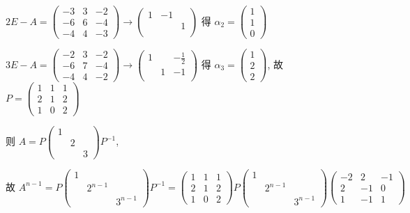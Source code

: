 		 \( 2E-A = \begin{pmatrix}
			 -3 & 3 & -2 \\
			 -6 & 6 & -4 \\
			 -4 & 4 & -3
		 \end{pmatrix} \rightarrow \begin{pmatrix}
			 1 & -1 &   \\
			   &    & 1 \\
			   &    &
		 \end{pmatrix} \) 得 \( \alpha_{2} = \begin{pmatrix}
			 1 \\
			 1 \\
			 0
		 \end{pmatrix} \)

		 \( 3E-A = \begin{pmatrix}
			 -2 & 3 & -2 \\
			 -6 & 7 & -4 \\
			 -4 & 4 & -2
		 \end{pmatrix} \rightarrow \begin{pmatrix}
			 1 &   & -\frac{1}{2} \\
			   & 1 & -1           \\
			   &   &
		 \end{pmatrix} \) 得 \( \alpha_{3} = \begin{pmatrix}
			 1 \\
			 2 \\
			 2
		 \end{pmatrix} \), 故 \( P = \begin{pmatrix}
			 1 & 1 & 1 \\
			 2 & 1 & 2 \\
			 1 & 0 & 2
		 \end{pmatrix} \)

		 则 \( A = P\begin{pmatrix}
			 1 &   &   \\
			   & 2 &   \\
			   &   & 3
		 \end{pmatrix}P^{-1} \),

		 \( \text{故 } A^{n-1}  = P\begin{pmatrix}
			 1 &         &         \\
			   & 2^{n-1} &         \\
			   &         & 3^{n-1}
		 \end{pmatrix}P^{-1}
		 = \begin{pmatrix}
			 1 & 1 & 1 \\
			 2 & 1 & 2 \\
			 1 & 0 & 2
		 \end{pmatrix}P\begin{pmatrix}
			 1 &         &         \\
			   & 2^{n-1} &         \\
			   &         & 3^{n-1}
		 \end{pmatrix}\begin{pmatrix}
			 -2 & 2  & -1 \\
			 2  & -1 & 0  \\
			 1  & -1 & 1
		 \end{pmatrix}\)

